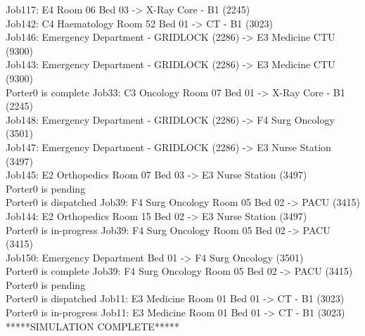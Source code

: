 \documentclass[paper=letter, fontsize=10pt]{scrartcl}
\numberwithin{equation}{section}		%
\numberwithin{figure}{section}			%
\numberwithin{table}{section}				%
\begin{document}
\begin{enumerate}[(i)]
\begin{enumerate}[(i)]
Job117: E4 Room 06 Bed 03 -> X-Ray Core - B1 (2245)\\
Job142: C4 Haematology Room 52 Bed 01 -> CT - B1 (3023)\\
Job146: Emergency Department - GRIDLOCK (2286) -> E3 Medicine CTU (9300)\\
Job143: Emergency Department - GRIDLOCK (2286) -> E3 Medicine CTU (9300)\\
Porter0 is complete Job33: C3 Oncology Room 07 Bed 01 -> X-Ray Core - B1 (2245)\\
Job148: Emergency Department - GRIDLOCK (2286) -> F4 Surg Oncology (3501)\\
Job147: Emergency Department - GRIDLOCK (2286) -> E3 Nurse Station (3497)\\
Job145: E2 Orthopedics Room 07 Bed 03 -> E3 Nurse Station (3497)\\
Porter0 is pending\\
Porter0 is dispatched Job39: F4 Surg Oncology Room 05 Bed 02 -> PACU (3415)\\
Job144: E2 Orthopedics Room 15 Bed 02 -> E3 Nurse Station (3497)\\
Porter0 is in-progress Job39: F4 Surg Oncology Room 05 Bed 02 -> PACU (3415)\\
Job150: Emergency Department Bed 01 -> F4 Surg Oncology (3501)\\
Porter0 is complete Job39: F4 Surg Oncology Room 05 Bed 02 -> PACU (3415)\\
Porter0 is pending\\
Porter0 is dispatched Job11: E3 Medicine Room 01 Bed 01 -> CT - B1 (3023)\\
Porter0 is in-progress Job11: E3 Medicine Room 01 Bed 01 -> CT - B1 (3023)\\
*****SIMULATION COMPLETE*****\\
\end{enumerate}


\end{enumerate}
\end{document}
